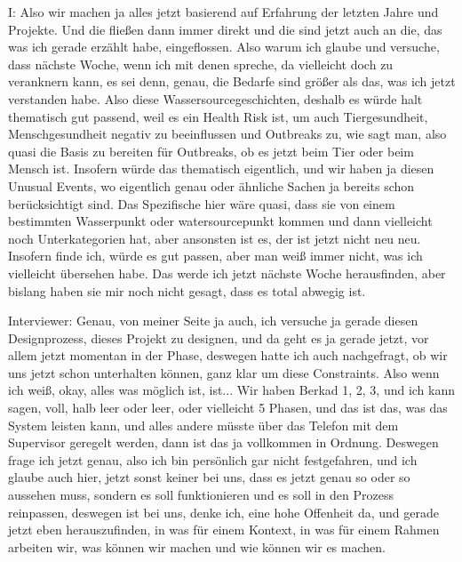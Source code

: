I: Also wir machen ja alles jetzt basierend auf Erfahrung der letzten Jahre und Projekte. Und die fließen dann immer direkt und die sind jetzt auch an die, das was ich gerade erzählt habe, eingeflossen. Also warum ich glaube und versuche, dass nächste Woche, wenn ich mit denen spreche, da vielleicht doch zu veranknern kann, es sei denn, genau, die Bedarfe sind größer als das, was ich jetzt verstanden habe. Also diese Wassersourcegeschichten, deshalb es würde halt thematisch gut passend, weil es ein Health Risk ist, um auch Tiergesundheit, Menschgesundheit negativ zu beeinflussen und Outbreaks zu, wie sagt man, also quasi die Basis zu bereiten für Outbreaks, ob es jetzt beim Tier oder beim Mensch ist. Insofern würde das thematisch eigentlich, und wir haben ja diesen Unusual Events, wo eigentlich genau oder ähnliche Sachen ja bereits schon berücksichtigt sind. Das Spezifische hier wäre quasi, dass sie von einem bestimmten Wasserpunkt oder watersourcepunkt kommen und dann vielleicht noch Unterkategorien hat, aber ansonsten ist es, der ist jetzt nicht neu neu. Insofern finde ich, würde es gut passen, aber man weiß immer nicht, was ich vielleicht übersehen habe. Das werde ich jetzt nächste Woche herausfinden, aber bislang haben sie mir noch nicht gesagt, dass es total abwegig ist. 

Interviewer: Genau, von meiner Seite ja auch, ich versuche ja gerade diesen Designprozess, dieses Projekt zu designen, und da geht es ja gerade jetzt, vor allem jetzt momentan in der Phase, deswegen hatte ich auch nachgefragt, ob wir uns jetzt schon unterhalten können, ganz klar um diese Constraints. Also wenn ich weiß, okay, alles was möglich ist, ist... Wir haben Berkad  1, 2, 3, und ich kann sagen, voll, halb leer oder leer, oder vielleicht 5 Phasen, und das ist das, was das System leisten kann, und alles andere müsste über das Telefon mit dem Supervisor geregelt werden, dann ist das ja vollkommen in Ordnung. Deswegen frage ich jetzt genau, also ich bin persönlich gar nicht festgefahren, und ich glaube auch hier, jetzt sonst keiner bei uns, dass es jetzt genau so oder so aussehen muss, sondern es soll funktionieren und es soll in den Prozess reinpassen, deswegen ist bei uns, denke ich, eine hohe Offenheit da, und gerade jetzt eben herauszufinden, in was für einem Kontext, in was für einem Rahmen arbeiten wir, was können wir machen und wie können wir es machen. 

